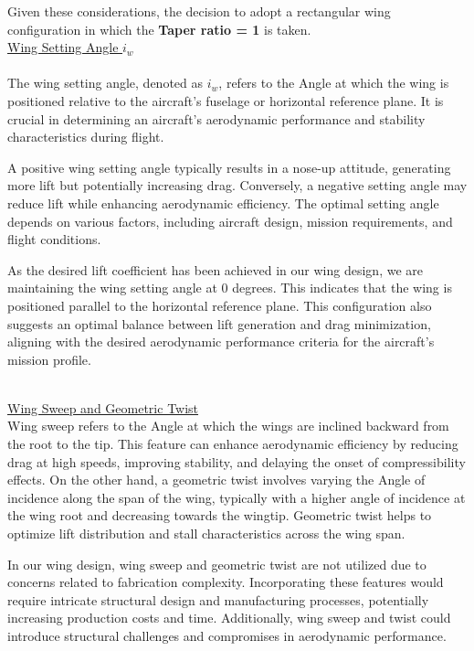 \documentclass[12 pt]{article}
\begin{document}
{ Given these considerations, the decision to adopt a rectangular wing configuration in which the\textbf{ Taper ratio = 1 }is taken.\\


\large{\underline{Wing Setting Angle $i_w$}}\\
\\ \color{black}
The wing setting angle, denoted as \( i_w \), refers to the Angle at which the wing is positioned relative to the aircraft's fuselage or horizontal reference plane. It is crucial in determining an aircraft's aerodynamic performance and stability characteristics during flight.

A positive wing setting angle typically results in a nose-up attitude, generating more lift but potentially increasing drag. Conversely, a negative setting angle may reduce lift while enhancing aerodynamic efficiency. The optimal setting angle depends on various factors, including aircraft design, mission requirements, and flight conditions.

As the desired lift coefficient has been achieved in our wing design,  we are maintaining the wing setting angle at 0 degrees. This indicates that the wing is positioned parallel to the horizontal reference plane. This configuration also suggests an optimal balance between lift generation and drag minimization, aligning with the desired aerodynamic performance criteria for the aircraft's mission profile.\\
\\ \vspace{10mm}

\large{\underline{Wing Sweep and Geometric Twist}}\\
\color{black}
Wing sweep refers to the Angle at which the wings are inclined backward from the root to the tip. This feature can enhance aerodynamic efficiency by reducing drag at high speeds, improving stability, and delaying the onset of compressibility effects. On the other hand, a geometric twist involves varying the Angle of incidence along the span of the wing, typically with a higher angle of incidence at the wing root and decreasing towards the wingtip. Geometric twist helps to optimize lift distribution and stall characteristics across the wing span.

In our wing design, wing sweep and geometric twist are not utilized due to concerns related to fabrication complexity. Incorporating these features would require intricate structural design and manufacturing processes, potentially increasing production costs and time. Additionally, wing sweep and twist could introduce structural challenges and compromises in aerodynamic performance.

}
\end{document}
